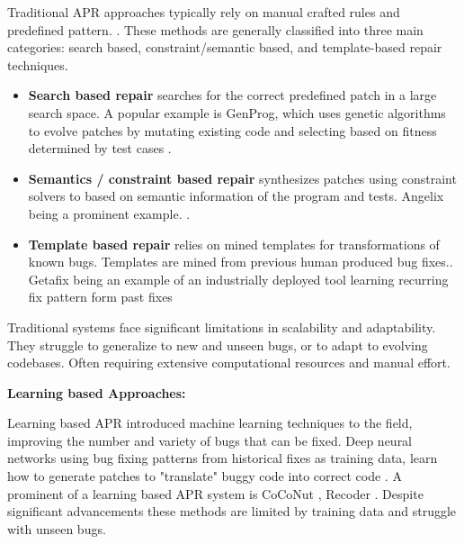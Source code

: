 Traditional APR approaches typically rely on manual crafted rules and predefined pattern. \cite{liuMarsCodeAgentAInative2024, xiaAutomatedProgramRepair2023,yinThinkRepairSelfDirectedAutomated2024}. These methods are generally classified into three main categories: search based, constraint/semantic based, and template-based repair techniques.
\begin{itemize}
    \item\textbf{Search based repair} searches for the correct predefined patch in a large search space. \cite{liuMarsCodeAgentAInative2024, huCanGPTO1Kill2024,zhangPATCHEmpoweringLarge2025} A popular example is GenProg, which uses genetic algorithms to evolve patches by mutating existing code and selecting based on fitness determined by test cases \cite{legouesGenProgGenericMethod2012}.

    \item\textbf{Semantics / constraint based repair} synthesizes patches using constraint solvers to based on semantic information of the program and tests. \cite{liuMarsCodeAgentAInative2024, mechtaevAngelixScalableMultiline2016} Angelix being a prominent example. \cite{mechtaevAngelixScalableMultiline2016}.

    \item\textbf{Template based repair} relies on mined templates for transformations of known bugs. \cite{xiaAutomatedProgramRepair2023} Templates are mined from previous human produced bug fixes.\cite{xiaAutomatedProgramRepair2023, yinThinkRepairSelfDirectedAutomated2024}. Getafix being an example of an industrially deployed tool learning recurring fix pattern form past fixes \cite{baderGetafixLearningFix2019}
\end{itemize}

Traditional systems face significant limitations in scalability and adaptability. They struggle to generalize to new and unseen bugs, or to adapt to evolving codebases. Often requiring extensive computational resources and manual effort. \cite{puvvadiCodingAgentsComprehensive2025, xiaAutomatedProgramRepair2024}


\textbf{Learning based Approaches:}

Learning based APR introduced machine learning techniques to the field, improving the number and variety of bugs that can be fixed. Deep neural networks using bug fixing patterns from historical fixes as training data, learn how to generate patches to "translate" buggy code into correct code \cite{xiaAutomatedProgramRepair2023, tangLargeLanguageModels2024}. A prominent of a learning based APR system is CoCoNut \cite{lutellierCoCoNuTCombiningContextaware2020}, Recoder \cite{zhuSyntaxguidedEditDecoder2021}. Despite significant advancements these methods are limited by training data and struggle with unseen bugs. \cite{xiaLessTrainingMore2022}


